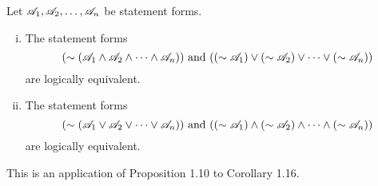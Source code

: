 \begin{proposition}
  Let \(\mathscr{A}_1, \mathscr{A}_2, \dots, \mathscr{A}_n\) be statement forms.
  \begin{enumerate}[(i)]
    \item The statement forms
  \[(\sim(\mathscr{A}_1 \land \mathscr{A}_2 \land \dots \land \mathscr{A}_n)) \text{ and } ((\sim \mathscr{A}_1) \lor (\sim \mathscr{A}_2) \lor \dots \lor (\sim \mathscr{A}_n))\]
  are logically equivalent.

    \item The statement forms
  \[(\sim(\mathscr{A}_1 \lor \mathscr{A}_2 \lor \dots \lor \mathscr{A}_n)) \text{ and } ((\sim \mathscr{A}_1) \land (\sim \mathscr{A}_2) \land \dots \land (\sim \mathscr{A}_n))\]
  are logically equivalent.
  \end{enumerate}

  \prf{} This is an application of Proposition 1.10 to Corollary 1.16.
\end{proposition}

